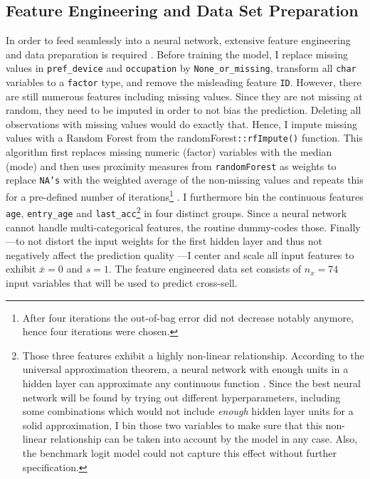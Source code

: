 \documentclass[12pt,a4paper]{article}
\newcommand{\pkg}[1]{{\normalfont\fontseries{b}\selectfont #1}}
\let\code=\texttt
\begin{document}
\subsection{Feature Engineering and Data Set Preparation}
In order to feed seamlessly into a neural network, extensive feature engineering and data preparation is required \citep{hastieElementsStatisticalLearning2017}.
Before training the model, I replace missing values in \code{pref\_device} and \code{occupation} by \code{None\_or\_missing}, transform all \code{char} variables to a \code{factor} type, and remove the misleading feature \code{ID}.
However, there are still numerous features including missing values. Since they are not missing at random, they need to be imputed in order to not
bias the prediction.
Deleting all observations with missing values would do exactly that.
Hence, I impute missing values with a Random Forest from the \pkg{randomForest}\code{::rfImpute()} function.
This algorithm first replaces missing numeric (factor) variables with the median (mode) and then uses proximity measures from \code{randomForest}
as weights to replace \code{NA's} with the weighted average of the non-missing values and repeats this for a
pre-defined number of iterations\footnote{After four iterations the out-of-bag error did not decrease notably anymore, hence four iterations were chosen.}
 \citep{liawClassificationRegressionRandomForest2002}.
I furthermore bin the continuous features \code{age}, \code{entry\_age} and \code{last\_acc}\footnote{Those three features exhibit a highly
non-linear relationship. According to the universal approximation theorem, a 
neural network with enough units in a hidden layer can approximate any continuous function \citep{hornikApproximationCapabilitiesMultilayer1991}.
Since the best neural network will be found by trying out different hyperparameters, including some combinations which would not include \textit{enough}
hidden layer units for a solid approximation, I bin
those two variables to make sure that this non-linear relationship can be taken into account by the model in any case. Also, the benchmark logit model
could not capture this effect without further specification.}
in four distinct groups.
Since a neural network cannot handle multi-categorical features, the routine dummy-codes those.
Finally---to not distort the input weights for the first hidden layer and thus not negatively affect the prediction quality 
\citep[pp. 398]{hastieElementsStatisticalLearning2017}---I center and scale all input features to exhibit $\bar{x}=0$ and $s=1$.
The feature engineered data set consists of $n_x = 74$ input variables that will be used to predict cross-sell. 
\end{document}
